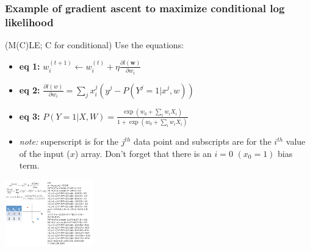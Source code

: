 \subsubsection{Example of gradient ascent to maximize conditional log likelihood}
(M(C)LE; C for conditional) \hfill
Use the equations: \hfill \\
\begin{itemize}
	\item \textbf{eq 1:} $w_i^{(t+1)} \leftarrow w_i^{(t)} + \eta \frac{\partial l(\bm{w})}{\partial w_i}$
	\item \textbf{eq 2:} $\displaystyle \frac{\partial l(w)}{\partial w_i} = \sum_j x_i^j (y^j - P(Y^j = 1 | x^j, w))$
	\item \textbf{eq 3:} $P(Y=1 | X, W) = \frac{\exp(w_0 + \sum_i w_i X_i)}{1 + \exp(w_0 + \sum_i w_i X_i)}$
	\item \textit{note:} superscript is for the $j^{th}$ data point and 
			subscripts are for the $i^{th}$ value of the input ($x$) array.  
			Don't forget that there is an $i=0$ $(x_0 = 1)$ bias term. 
\end{itemize}
\includegraphics[width=1.5in]{figures/gradient_ascent_logistic_regression.pdf}   \hfill \\

